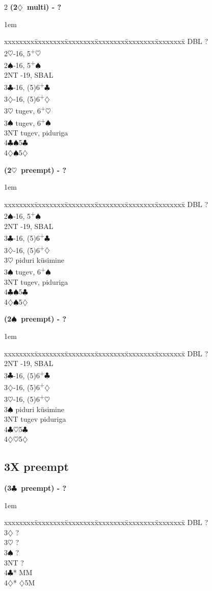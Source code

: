 \documentclass[10pt]{article}
\renewcommand{\c}{$\clubsuit$}
\renewcommand{\d}{$\diamondsuit$}
\newcommand{\h}{$\heartsuit$}
\newcommand{\s}{$\spadesuit$}
\newcommand{\p}{\textsuperscript{+}}
\newcommand{\x}{DBL}
\newenvironment{bidtable}[1][]
{\textbf{#1}
  \begin{adjustwidth}{1em}{}
    \addvspace{2pt}
    \begin{tabbing}
      xxxxxxxx\=xxxxxxxx\=xxxxxxxx\=xxxxxxxx\=xxxxxxxx\=xxxxxxxx\=\kill}
{\end{tabbing}\end{adjustwidth}\bigskip}%
\begin{document}
\begin{multicols*}{2}
\begin{bidtable}[(2\d\ multi) - ?]
\x  \> ?               \\
2\h {}-16, 5\p\h    \\
2\s {}-16, 5\p\s    \\
2NT -19, SBAL     \\
3\c {}-16, (5)6\p\c \\
3\d {}-16, (5)6\p\d \\
3\h \> tugev, 6\p\h    \\
3\s \> tugev, 6\p\s    \\
3NT \> tugev, piduriga \\
4\c {}\s 5\c         \\
4\d {}\s 5\d
\end{bidtable}

\begin{bidtable}[(2\h\ preempt) - ?]
\x  \> ?               \\
2\s {}-16, 5\p\s    \\
2NT -19, SBAL     \\
3\c {}-16, (5)6\p\c \\
3\d {}-16, (5)6\p\d \\
3\h \> piduri küsimine \\
3\s \> tugev, 6\p\s    \\
3NT \> tugev, piduriga \\
4\c {}\s 5\c         \\
4\d {}\s 5\d
\end{bidtable}


\begin{bidtable}[(2\s\ preempt) - ?]
\x  \> ?               \\
2NT -19, SBAL     \\
3\c {}-16, (5)6\p\c \\
3\d {}-16, (5)6\p\d \\
3\h {}-16, (5)6\p\h \\
3\s \> piduri küsimine \\
3NT \> tugev piduriga  \\
4\c {}\h 5\c         \\
4\d {}\h 5\d
\end{bidtable}

\subsection{3X preempt}

\begin{bidtable}[(3\c\ preempt) - ?]
\x   \> ?     \\
3\d  \> ?     \\
3\h  \> ?     \\
3\s  \> ?     \\
3NT  \> ?     \\
4\c* {} MM \\
4\d* {}\d 5M
\end{bidtable}


\end{multicols*}
\end{document}
